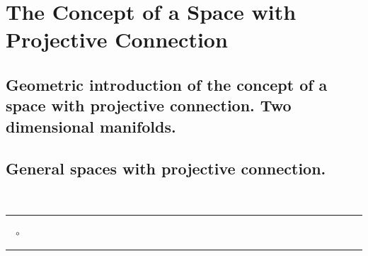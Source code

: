 
\chapter{The Concept of a Space with Projective Connection}
             
\section{Geometric introduction of the concept of a space with projective connection. Two dimensional manifolds.}





\section{General spaces with projective connection.}
















\ \\[3cm]
\begin{center}
\rule{2cm}{.05cm} \ \ $\circ$ \ \ \rule{2cm}{.05cm} 
\end{center} 





























